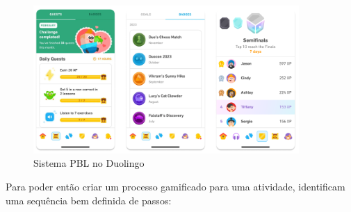 \documentclass[
	12pt,
	openright,
	twoside,
	a4paper,
	english,
	brazil
	]{abntex2}
\begin{document}
\begin{figure}[H]
  \centering
	\caption{\label{duolingo}Sistema PBL no Duolingo}
  \includegraphics[width=0.9\textwidth]{duolingo}
\end{figure}

Para poder então criar um processo gamificado para uma atividade,  identificam uma sequência bem definida de passos:

\renewcommand{\arraystretch}{1.3}
\end{document}

